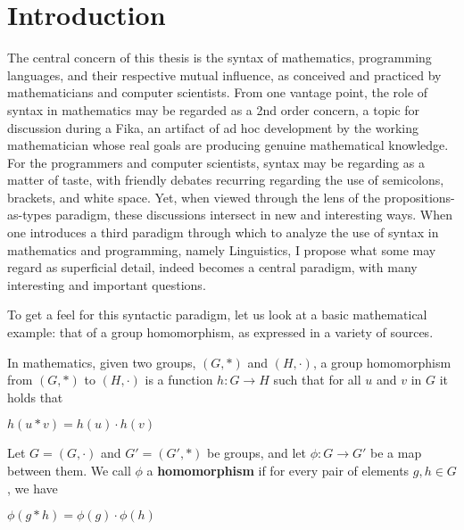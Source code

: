 \section{Introduction}
\label{sec:intro}

The central concern of this thesis is the syntax of mathematics, programming
languages, and their respective mutual influence, as conceived and practiced by
mathematicians and computer scientists.  From one vantage point, the role of
syntax in mathematics may be regarded as a 2nd order concern, a topic for
discussion during a Fika, an artifact of ad hoc development by the working
mathematician whose real goals are producing genuine mathematical knowledge.
For the programmers and computer scientists, syntax may be regarding as a
matter of taste, with friendly debates recurring regarding the use of
semicolons, brackets, and white space.  Yet, when viewed through the lens of
the propositions-as-types paradigm, these discussions intersect in new and
interesting ways.  When one introduces a third paradigm through which to
analyze the use of syntax in mathematics and programming, namely Linguistics, I
propose what some may regard as superficial detail, indeed becomes a central
paradigm, with many interesting and important questions. 

To get a feel for this syntactic paradigm, let us look at a basic mathematical
example: that of a group homomorphism, as expressed in a variety of sources.  


\begin{definition}
In mathematics, given two groups, $(G, \ast)$ and $(H, \cdot)$, a group homomorphism from $(G, \ast)$ to $(H, \cdot)$ is a function $h : G \to H$ such that for all $u$ and $v$ in $G$ it holds that

\begin{center}
  $h(u \ast v) = h ( u ) \cdot h ( v )$ 
\end{center}
\end{definition}


\begin{definition}
Let $G = (G,\cdot)$ and $G' = (G',\ast)$ be groups, and let $\phi : G \to G'$ be a map between them. We call $\phi$ a \textbf{homomorphism} if for every pair of elements $g, h \in G$, we have 
\begin{center}
  $\phi(g \ast h) = \phi ( g ) \cdot \phi ( h )$ 
\end{center}
\end{definition}

